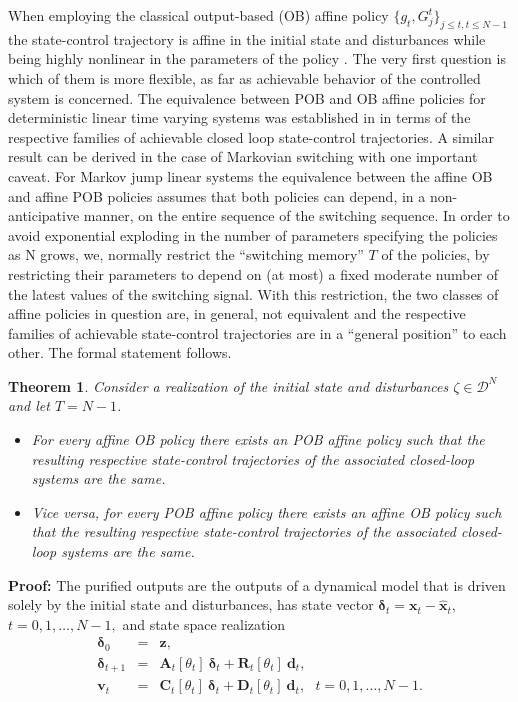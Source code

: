 \documentclass[letterpaper,11pt]{article}
\newtheorem{theorem}{Theorem}
\begin{document}
When employing the classical output-based (OB) affine policy  $\{ g_{t}, G_j^t \}_{j \leq t, t \leq N-1} $ 
the state-control trajectory is affine 
in the initial state and disturbances while being highly nonlinear in the parameters of the policy \cite{bental2}.
The very first question 
is which of them is more flexible, as far as achievable behavior of the controlled system is concerned. 
The equivalence between POB and OB affine policies for deterministic linear time varying systems was established in 
\cite{bental2} in terms of the respective families of achievable closed loop state-control trajectories. 
A similar result can be derived in the case of Markovian switching with one important caveat. 
For Markov jump linear systems
the equivalence between the affine OB and affine POB policies assumes that both policies can depend, 
in a non-anticipative manner, on the entire sequence of the switching sequence. In order to avoid exponential exploding in the number of parameters specifying the policies as N grows, 
we, normally  restrict the ``switching memory'' $T$ of the policies, by restricting their parameters to depend on (at most) a fixed moderate number of the latest values of the switching signal. 
With this restriction, the two classes of affine policies in question are, in general, not equivalent  and the respective families of achievable state-control trajectories are in a ``general position'' to each other. The formal statement follows.
\begin{theorem} 
	\label{Theorem 1}
	Consider a  realization of the initial state and disturbances 
	$  \zeta \in\mathscr{D}^N$ and let $T = N-1$.
	\begin{itemize}	
		\item [(i)] For every affine OB policy  there exists an POB affine policy  
		 such that the resulting respective state-control trajectories 
		of the associated closed-loop systems are the same. 
		\item [(ii)] Vice versa, for every POB affine policy there exists an affine  OB policy such that the resulting respective state-control trajectories 
		of the associated closed-loop systems are the same. 
	\end{itemize}
\end{theorem}

\textbf{Proof:}
The purified outputs are the outputs of a dynamical model that is driven solely by the initial state and disturbances, has state vector
$ \bm{\delta}_t = \mathbf{x}_t - \hat{\mathbf{x}}_t $, $ t =0,1, \hdots, N-1,$ and  state space realization
\begin{eqnarray*}
\nonumber
\bm{\delta}_0 & = & \mathbf{z},\\
\bm{\delta}_{t+1} & = & \mathbf{A}_t[\theta_t] ~ \bm{\delta}_t + \mathbf{R}_t[\theta_t] ~ \mathbf{d}_t,   \\
\nonumber
\mathbf{v}_t  & = & \mathbf{C}_t[\theta_t] ~ \bm{\delta}_t +  \mathbf{D}_t[\theta_t] ~ \mathbf{d}_t,~~~  
t =0,1, \hdots, N-1.
\end{eqnarray*}
\end{document}

